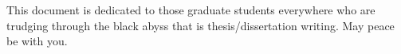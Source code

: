 This document is dedicated to those graduate students everywhere who are trudging through the black abyss that is thesis/dissertation writing. \newline
May peace be with you.
